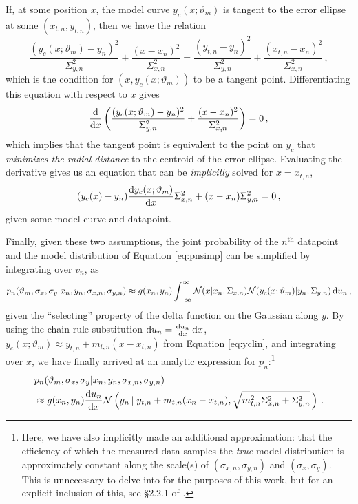 If, at some position $x$, the model curve $y_c(x;\vartheta_m)$ is tangent to the error ellipse at some $(x_{t,n},y_{t,n})$, then we have the relation 
\begin{equation}\label{eq:tpoint1}
\frac{(y_c(x;\vartheta_m)-y_n)^2}{\Sigma_{y,n}^2}+\frac{(x-x_n)^2}{\Sigma_{x,n}^2} =  \frac{(y_{t,n}-y_n)^2}{\Sigma_{y,n}^2}+\frac{(x_{t,n}-x_n)^2}{\Sigma_{x,n}^2}\, ,
\end{equation}
which is the condition for $(x, y_c(x;\vartheta_m))$ to be a tangent point. Differentiating this equation with respect to $x$ gives
\begin{equation}\label{eq:tpoint2}
\dv{}{x}\left({\frac{(y_c(x;\vartheta_m)-y_n)^2}{\Sigma_{y,n}^2}+\frac{(x-x_n)^2}{\Sigma_{x,n}^2}}\right)=0 \, ,
\end{equation}
which implies that the tangent point is equivalent to the point on $y_c$ that \textit{minimizes the radial distance} to the centroid of the error ellipse. Evaluating the derivative gives us an equation that can be \textit{implicitly} solved for $x=x_{t,n}$,
\begin{equation}\label{eq:tpoint}
(y_c(x)-y_n)\dv{y_c(x;\vartheta_m)}{x}\Sigma_{x,n}^2+(x-x_n)\Sigma_{y,n}^2 = 0 \, ,
\end{equation}
given some model curve and datapoint.%

Finally, given these two assumptions, the joint probability of the $n^\text{th}$ datapoint and the model distribution of Equation \eqref{eq:pnsimp} can be simplified by integrating over $v_n$, as
\begin{align}\label{eq:pnappint}
p_n(\vartheta_m,\sigma_x,\sigma_y|x_n,y_n,\sigma_{x,n},\sigma_{y,n}) \approx g(x_n,y_n)\int_{-\infty}^{\infty}{\mathcal{N}(x|x_n,\Sigma_{x,n})\mathcal{N}(y_c(x;\vartheta_m)|y_n,\Sigma_{y,n})\mathop{}\!\mathrm{d} u_n}\, ,
\end{align}
given the ``selecting'' property of the delta function on the Gaussian along $y$. By using the chain rule substitution $\mathop{}\!\mathrm{d} u_n = \dv{u_n}{x}\mathop{}\!\mathrm{d} x$, $y_c(x;\vartheta_m)\approx y_{t,n}+m_{t,n}(x-x_{t,n})$ from Equation \eqref{eq:yclin}, and integrating over $x$, we have finally arrived at an analytic expression for $p_n$:\footnote{Here, we have also implicitly made an additional approximation: that the efficiency of which the measured data samples the \textit{true} model distribution is approximately constant along the scale(s) of $(\sigma_{x,n}, \sigma_{y,n})$ and $(\sigma_x,\sigma_y)$. This is unnecessary to delve into for the purposes of this work, but for an explicit inclusion of this, see \S2.2.1 of \textcite{trotter}.} 
\begin{align}\label{eq:pnanaly}
&p_n(\vartheta_m,\sigma_x,\sigma_y|x_n,y_n,\sigma_{x,n},\sigma_{y,n}) \\ &\approx g(x_n,y_n)\dv{u_n}{x}\mathcal{N}\left(y_n\left|\right.y_{t,n}+m_{t,n}(x_n-x_{t,n}),\sqrt{m_{t,n}^2\Sigma_{x,n}^2+\Sigma_{y,n}^2}\,\right) \nonumber \, .
\end{align}

